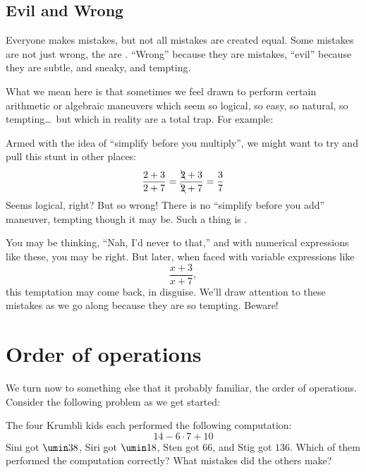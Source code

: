 \subsection{Evil and Wrong}

Everyone makes mistakes, but not all mistakes are created equal. Some mistakes are not just wrong, the are \evilandwrong. ``Wrong'' because they are mistakes, ``evil'' because they are subtle, and sneaky, and tempting.

What we mean here is that sometimes we feel drawn to perform certain arithmetic or algebraic maneuvers which seem so logical, so easy, so natural, so tempting\ldots\ but which in reality are a total trap. For example:

\begin{boxwarn}
Armed with the idea of ``simplify before you multiply'', we might want to try and pull this stunt in other places: \[\frac{2+3}{2+7} = \frac{\bcancel{2}+3}{\bcancel{2}+7} = \frac{3}{7}\]Seems logical, right? But so wrong! There is no ``simplify before you add'' maneuver, tempting though it may be. Such a thing is \evilandwrong.
\end{boxwarn}

You may be thinking, ``Nah, I'd never to that,'' and with numerical expressions like these, you may be right. But later, when faced with variable expressions like \[\frac{x+3}{x+7},\]
this temptation may come back, in disguise. We'll draw attention to these \evilandwrong{} mistakes as we go along because they are so tempting. Beware!


\section{Order of operations}
\label{sec:orderofops}

We turn now to something else that it probably familiar, the \gls{order of operations}. Consider the following problem as we get started:

\begin{boxexplore}
The four Krumbli kids each performed the following computation: \[14 - 6 \cdot 7 + 10\] Sini got $\umin38$,
Siri got $\umin18$,
Sten got $66$,
and Stig got $136$. Which of them performed the computation correctly? What mistakes did the others make?
\end{boxexplore}


